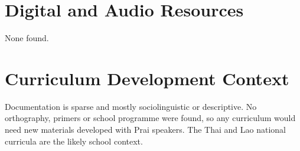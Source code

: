 \documentclass[12pt]{article}
\begin{document}
\section{Digital and Audio Resources}
None found.

\section{Curriculum Development Context}
Documentation is sparse and mostly sociolinguistic or descriptive. No orthography, primers or school programme were found, so any curriculum would need new materials developed with Prai speakers. The Thai and Lao national curricula are the likely school context.
\end{document}
